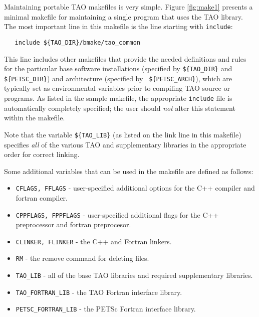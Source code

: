 Maintaining portable TAO makefiles is very simple.  Figure
\ref{fig:make1} presents a minimal makefile for maintaining a single
program that uses the TAO library.  The most important line in this
makefile is the line starting with \texttt{include}:
\begin{verbatim}
   include ${TAO_DIR}/bmake/tao_common
\end{verbatim} 
\noindent
{} This line includes other makefiles that provide the
needed definitions and rules for the particular base software
installations (specified by \texttt{\$\{TAO\_DIR\}} and {\tt
  \$\{PETSC\_DIR\}}) and architecture (specified by {\tt
  \$\{PETSC\_ARCH\}}), which are typically set as environmental
variables prior to compiling TAO source or programs.  As listed in the
sample makefile, the appropriate \texttt{include} file is automatically
completely specified; the user should {\em not} alter this statement
within the makefile.

Note that the variable \texttt{\$\{TAO\_LIB\}} (as listed on the link
line in this makefile) specifies {\em all} of the various TAO and
supplementary libraries in the appropriate order for correct linking.


\begin{comment}
  The second sample makefile, given in Figure~\ref{fig:make2},
  controls the generation of several example programs.  Again, the
  most important line in this makefile is the \texttt{include} line that
  includes the files defining all of the macro variables.
\end{comment}

Some additional variables that can be used in the makefile are defined
as follows:
\begin{itemize}
\item \texttt{CFLAGS, FFLAGS} - user-specified additional options for the
  C++ compiler and fortran compiler.
\item \texttt{CPPFLAGS, FPPFLAGS} - user-specified additional flags
        for the C++ preprocessor and fortran preprocesor.
\item \texttt{CLINKER, FLINKER} - the C++ and Fortran linkers. 
\item \texttt{RM} - the remove command for deleting files.
\item \texttt{TAO\_LIB} - all of the base TAO libraries and required supplementary libraries.
\item \texttt{TAO\_FORTRAN\_LIB} - the TAO Fortran interface
             library. 
\item \texttt{PETSC\_FORTRAN\_LIB} - the PETSc Fortran interface
             library. 
\end{itemize}

